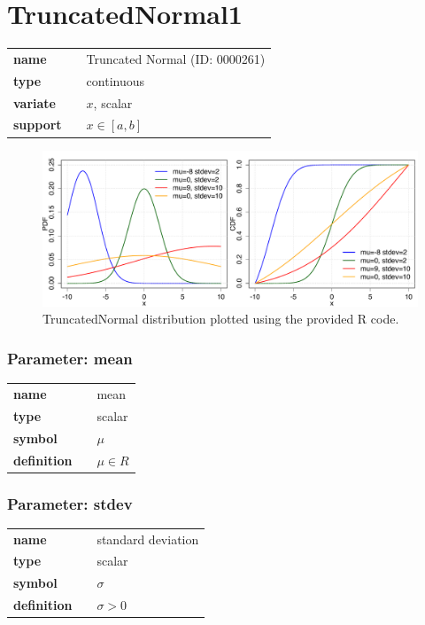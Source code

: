\section*{TruncatedNormal1} 

  \bigskip 

\begin{tabular}{p{2cm}cl}
\textbf{name} & & Truncated Normal (ID: 0000261)\\ 
 
\textbf{type} & & continuous \\ 

\textbf{variate} & & $x$, scalar \\ 

\textbf{support} & & $x \in [a,b]$
\end{tabular}

\begin{figure}[ht!]
\centering
  \includegraphics[width=140mm]{pics/TruncatedNormal.pdf}
 \caption{TruncatedNormal distribution plotted using the provided R code.}
 \label{fig:TruncatedNormal}
\end{figure}

\subsubsection*{Parameter: mean}

\noindent\begin{tabular}{p{2cm}cl}
\textbf{name} & & mean \\
\textbf{type} & & scalar \\
\textbf{symbol} & & $\mu$  \\
\textbf{definition} & & $\mu \in R$
\end{tabular}
\subsubsection*{Parameter: stdev}

\noindent\begin{tabular}{p{2cm}cl}
\textbf{name} & & standard deviation \\
\textbf{type} & & scalar \\
\textbf{symbol} & & $\sigma$  \\
\textbf{definition} & & $\sigma > 0$
\end{tabular}
